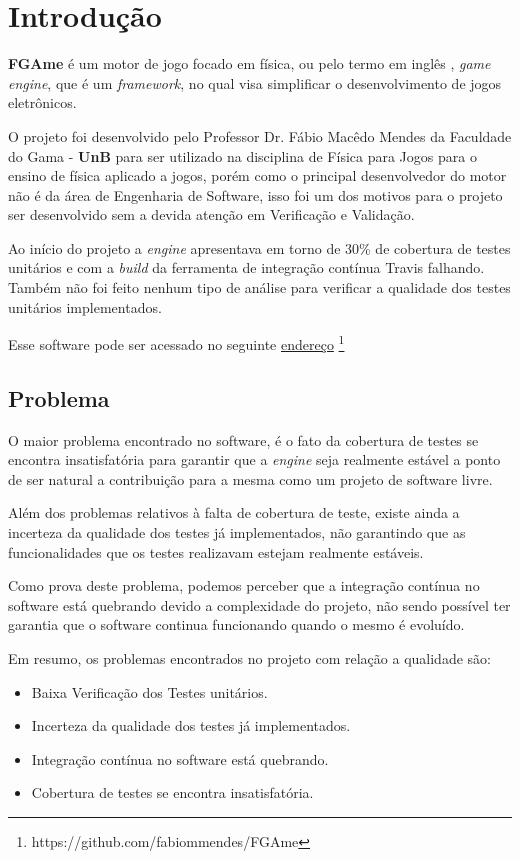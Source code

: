 \chapter[Introdução]{Introdução}
\textbf{FGAme} é um motor de jogo focado em física, ou pelo termo em inglês , \textit{game} \textit{engine}, que é um \textit{framework}, no qual visa simplificar o desenvolvimento de jogos eletrônicos.

O projeto foi desenvolvido pelo Professor Dr. Fábio Macêdo Mendes da Faculdade do Gama - \textbf{UnB} para ser utilizado na disciplina de Física para Jogos para o ensino de física aplicado a jogos, porém como o principal desenvolvedor do motor não é da área de Engenharia de Software, isso foi um dos motivos para o projeto ser desenvolvido sem a devida atenção em Verificação e Validação.

Ao início do projeto a \textit{engine} apresentava em torno de 30\% de cobertura de testes unitários e com a \textit{build} da ferramenta de integração contínua Travis falhando. Também não foi feito nenhum tipo de análise para verificar a qualidade dos testes unitários implementados.

Esse software pode ser acessado no seguinte \href{https://github.com/fabiommendes/FGAme}{endereço}%
\footnote{https://github.com/fabiommendes/FGAme}

\section{Problema}

O maior problema encontrado no software, é o fato da cobertura de testes se encontra insatisfatória para garantir que a \textit{engine} seja realmente estável a ponto de ser natural a contribuição para a mesma como um projeto de software livre.

Além dos problemas relativos à falta de cobertura de teste, existe ainda a incerteza da qualidade dos testes já implementados, não garantindo que as funcionalidades que os testes realizavam estejam realmente estáveis.

Como prova deste problema, podemos perceber que a integração contínua no software está quebrando devido a complexidade do projeto, não sendo possível ter garantia que o software continua funcionando quando o mesmo é evoluído.

Em resumo, os problemas encontrados no projeto com relação a qualidade são:
\begin{itemize}
\item Baixa Verificação dos Testes unitários.
\item Incerteza da qualidade dos testes já implementados.
\item Integração contínua no software está quebrando.
\item Cobertura de testes se encontra insatisfatória.
\end{itemize}


